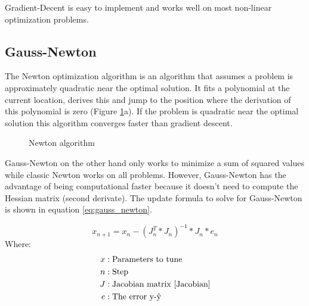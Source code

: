 \documentclass[11pt,a4paper,titlepage,oneside]{report}
\begin{document}
Gradient-Decent is easy to implement and works well on most non-linear optimization problems.

\subsection{Gauss-Newton}
The Newton optimization algorithm is an algorithm that assumes a problem is approximately quadratic near the optimal solution. It fits a polynomial at the current location, derives this and jump to the position where the derivation of this polynomial is zero (Figure \ref{fig:newton}a). If the problem is quadratic near the optimal solution this algorithm converges faster than gradient descent.

\begin{figure}[H]
	\centering
	\qquad
	\caption{Newton algorithm}
	\label{fig:newton}
\end{figure}

Gauss-Newton on the other hand only works to minimize a sum of squared values while classic Newton works on all problems. However, Gauss-Newton has the advantage of being computational faster \cite{gauss_newton} because it doesn't need to compute the Hessian matrix (second derivate). The update formula to solve for Gauss-Newton is shown in equation \ref{eq:gauss_newton}.

\begin{equation}\label{eq:gauss_newton}
  x_{n+1} = x_n - (J_n^T*J_n)^{-1}*J_n*e_n
\end{equation}
Where:
\begin{align*}
  x		  &: \text{Parameters to tune}\\
  n		  &: \text{Step}\\
	J		  &: \text{Jacobian matrix \cite{Jacobian}}\\
  e  	  &: \text{The error y-ŷ}
\end{align*}
\end{document}
